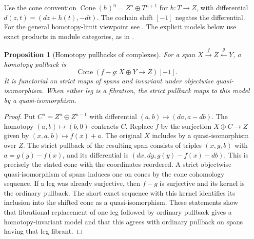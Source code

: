 \documentclass[11pt,oneside,openany]{book}
\newtheorem{proposition}[theorem]{Proposition}
\theoremstyle{definition}
\theoremstyle{remark}
\begin{document}
Use the cone convention
\(\operatorname{Cone}(h)^n=Z^n\oplus T^{n+1}\)
for \(h:T\to Z\), with differential
\(d(z,t)=(dz+h(t),-dt)\).
The cochain shift \([-1]\) negates the differential.
For the general homotopy-limit viewpoint see
\cite[Chapters 5--6]{riehl}. The explicit models below use exact
products in module categories, as in \cite[Section 34]{st-derived}.

\begin{proposition}[Homotopy pullbacks of complexes]\label{res:Q16}
For a span \(X\xrightarrow{f} Z\xleftarrow{g}Y\),
a homotopy pullback is
\[
 \operatorname{Cone}(f-g:X\oplus Y\longrightarrow Z)[-1].
\]
It is functorial on strict maps of spans and invariant under
objectwise quasi-isomorphism. When either leg is a fibration,
the strict pullback maps to this model by a quasi-isomorphism.
\end{proposition}
\begin{proof}
Put \(C^n=Z^n\oplus Z^{n-1}\) with differential
\((a,b)\mapsto(da,a-db)\). The homotopy
\((a,b)\mapsto(b,0)\) contracts \(C\). Replace \(f\)
by the surjection \(X\oplus C\to Z\) given by
\((x,a,b)\mapsto f(x)+a\). The original \(X\) includes
by a quasi-isomorphism over \(Z\). The strict pullback
of the resulting span consists of triples
\((x,y,b)\) with \(a=g(y)-f(x)\), and its differential
is \((dx,dy,g(y)-f(x)-db)\). This is precisely the
stated cone with the coordinates reordered.
A strict objectwise quasi-isomorphism of spans induces
one on cones by the cone cohomology sequence.
If a leg was already surjective, then \(f-g\)
is surjective and its kernel is the ordinary pullback.
The short exact sequence with this kernel identifies
its inclusion into the shifted cone as a quasi-isomorphism.
These statements show that fibrational replacement
of one leg followed by ordinary pullback gives a
homotopy-invariant model and that this agrees with
ordinary pullback on spans having that leg fibrant.
\end{proof}
\end{document}
